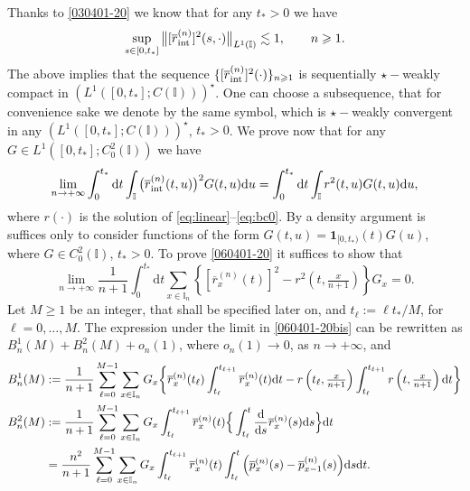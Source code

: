 \documentclass[EJP]{ejpecp} %
\newcommand\T{{\mathbb I}}
\renewcommand{\ge}{\geqslant}
\newcommand{\dd  }{\mathrm{d}}
\renewcommand{\bar}{\overline}
\numberwithin{equation}{section}
\begin{document}
Thanks to \eqref{030401-20} we know that
for any $t_*>0$ we have
\begin{equation}
\label{010203x}
\sup_{s\in[0,t_*]}\big\|[\bar
r^{(n)}_{\rm int}]^2 (s,\cdot)\big\|_{L^1(\T)}\lesssim 1,\qquad n\ge 1.
\end{equation}
The above implies that  the sequence $\{[\bar
  r^{(n)}_{\rm int}]^2 (\cdot)\}_{n\ge1}$ is sequentially $\star-$weakly
compact in $\left(L^1([0,t_*];C(\T))\right)^\star$. One can choose a
subsequence, that for convenience sake we denote by the same symbol, which is $\star-$weakly
convergent in any $\left(L^1([0,t_*];C(\T))\right)^\star$, $t_*>0$.
We prove now that for any  $G\in
L^1([0,t_*];C^2_{0}(\T))$ we have
\begin{equation}
\label{060401-20}
\lim_{n\to+\infty}\int_0^{t_*}\dd t\int_\T\big(\bar
r^{(n)}_{\rm int} (t,u)\big)^2G(t,u)\dd u= \int_0^{t_*}\dd t\int_\T
r^2 (t,u)G(t,u)\dd u,
\end{equation}
where $r(\cdot)$ is the solution of \eqref{eq:linear}--\eqref{eq:bc0}. By a density
argument is suffices only to consider functions of the form
$G(t,u)=\mathbf{1}_{[0,t_*)}(t)G(u)$, where $G\in C^2_{0}(\T)$, $t_*>0$.
To prove \eqref{060401-20} it suffices to show that
\begin{equation}
\label{060401-20bis}
\lim_{n\to+\infty}\frac{1}{n+1}\int_0^{t_*}\dd t\sum_{x\in\T_n}\left\{[\bar
r^{(n)}_x (t)]^2-r^2\left(t,\tfrac{x}{n+1}\right)\right\}G_x=0.
\end{equation}
Let $M\ge 1$ be an integer, that shall be specified later on, and 
$t_\ell:=\ell t_*/M$, for $\ell=0,\ldots,M$. 
The expression under the limit in \eqref{060401-20bis}
can be rewritten as $B_n^1(M)+B_n^2(M)+o_n(1)$, where $o_n(1)\to0$, as $n\to+\infty$, and
\begin{align}
B_n^1(M)& :=\frac{1}{n+1}\sum_{\ell=0}^{M-1}\sum_{x\in\T_n}G_x\bigg\{  \bar
r^{(n)}_x (t_\ell)\int_{t_\ell}^{t_{\ell+1}} \bar
r^{(n)}_x (t) \dd t  -r\left(t_\ell,\tfrac{x}{n+1}\right)
  \int_{t_\ell}^{t_{\ell+1}}r\left(t,\tfrac{x}{n+1}\right) \dd t\bigg\}\notag\\
B_n^2(M)&:=\frac{1}{n+1}\sum_{\ell=0}^{M-1}\sum_{x\in\T_n}G_x\int_{t_\ell}^{t_{\ell+1}}  \bar
r^{(n)}_x (t) \Big\{\int_{t_\ell}^t  \frac{\dd}{\dd s}\bar
r^{(n)}_x (s)\dd s \Big\}  \dd t \notag\\
&
=\frac{n^2}{n+1}\sum_{\ell=0}^{M-1}\sum_{x\in\T_n}G_x \int_{t_\ell}^{t_{\ell+1}}\bar
r^{(n)}_x (t) \int_{t_\ell}^t\Big(\bar
p^{(n)}_x (s)-\bar  p^{(n)}_{x-1} (s)\Big) \dd s  \dd t  .
\label{B-n}
\end{align}
\end{document}
